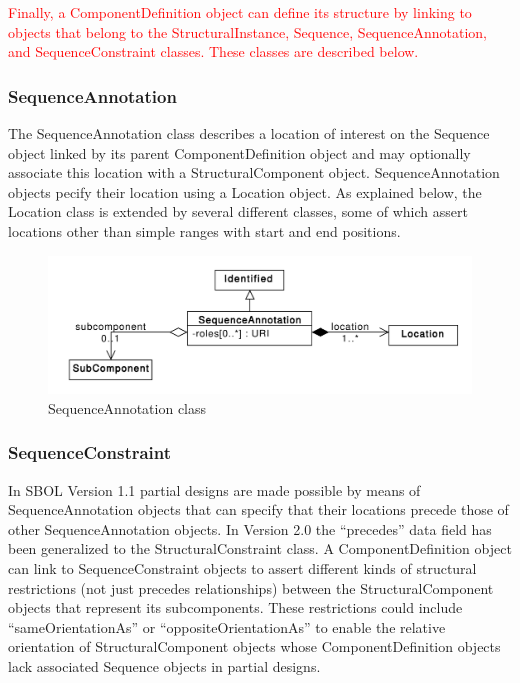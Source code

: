 \documentclass[draftspec]{sbmlpkgspec}
\begin{document}
\textcolor{red}{Finally, a ComponentDefinition object can define its structure by linking to objects that belong to the StructuralInstance, Sequence, SequenceAnnotation, and SequenceConstraint classes. These classes are described below.}

\subsubsection{SequenceAnnotation}
\label{sec:SequenceAnnotation}
The SequenceAnnotation class describes a location of interest on the Sequence object linked by its parent ComponentDefinition object and may optionally associate this location with a StructuralComponent object. SequenceAnnotation objects pecify their location using a Location object. As explained below, the Location class is extended by several different classes, some of which assert locations other than simple ranges with start and end positions.

\begin{figure}[ht]
\begin{center}
\includegraphics[scale=0.6]{uml/sequence_annotation}
\caption[]{SequenceAnnotation class}
\label{uml:sequence_annotation}
\end{center}
\end{figure}




\subsubsection{SequenceConstraint}
\label{sec:SequenceConstraint}
In SBOL Version 1.1 partial designs are made possible by means of SequenceAnnotation objects that can specify that their locations precede those of other SequenceAnnotation objects. In Version 2.0 the “precedes” data field has been generalized to the StructuralConstraint class. A ComponentDefinition object can link to SequenceConstraint objects to assert different kinds of structural restrictions (not just precedes relationships) between the StructuralComponent objects that represent its subcomponents. These restrictions could include “sameOrientationAs” or “oppositeOrientationAs” to enable the relative orientation of StructuralComponent objects whose ComponentDefinition objects lack associated Sequence objects in partial designs.
\end{document}
